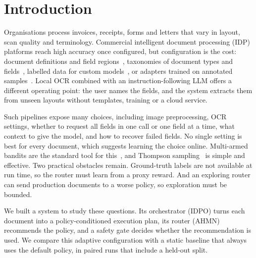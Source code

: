 \documentclass[conference,a4paper]{IEEEtran}
\begin{document}
\section{Introduction}
\label{sec:intro}

Organisations process invoices, receipts, forms and letters that vary in layout, scan quality and terminology. Commercial intelligent document processing (IDP) platforms reach high accuracy once configured, but configuration is the cost: document definitions and field regions~\cite{abbyyfields}, taxonomies of document types and fields~\cite{uipath}, labelled data for custom models~\cite{azurecustom}, or adapters trained on annotated samples~\cite{textractcustom}. Local OCR combined with an instruction-following LLM offers a different operating point: the user names the fields, and the system extracts them from unseen layouts without templates, training or a cloud service.

Such pipelines expose many choices, including image preprocessing, OCR settings, whether to request all fields in one call or one field at a time, what context to give the model, and how to recover failed fields. No single setting is best for every document, which suggests learning the choice online. Multi-armed bandits are the standard tool for this~\cite{lattimore2020}, and Thompson sampling~\cite{thompson1933,chapelle2011} is simple and effective. Two practical obstacles remain. Ground-truth labels are not available at run time, so the router must learn from a proxy reward. And an exploring router can send production documents to a worse policy, so exploration must be bounded.

We built a system to study these questions. Its orchestrator (IDPO) turns each document into a policy-conditioned execution plan, its router (AHMN) recommends the policy, and a safety gate decides whether the recommendation is used. We compare this adaptive configuration with a static baseline that always uses the default policy, in paired runs that include a held-out split.
\end{document}
